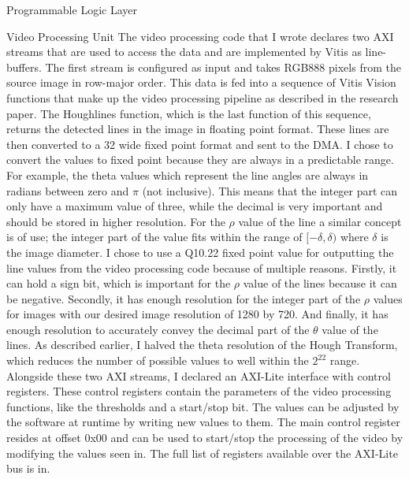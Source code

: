 \documentclass{matthijs}
\begin{document}
\begin{hoofdstuk}{Programmable Logic Layer}
\begin{paragraaf}{Video Processing Unit}
			The video processing code that I wrote declares two AXI streams that are used to access the data and are implemented by Vitis as line-buffers.
			The first stream is configured as input and takes RGB888 pixels from the source image in row-major order.
			This data is fed into a sequence of Vitis Vision functions that make up the video processing pipeline as described in the research paper.
			The Houghlines function, which is the last function of this sequence, returns the detected lines in the image in floating point format.
			These lines are then converted to a \qty{32}{\bit} wide fixed point format and sent to the DMA.
			I chose to convert the values to fixed point because they are always in a predictable range.
			For example, the theta values which represent the line angles are always in radians between zero and $ \pi $ (not inclusive).
			This means that the integer part can only have a maximum value of three, while the decimal is very important and should be stored in higher resolution.
			For the $ \rho $ value of the line a similar concept is of use; the integer part of the value fits within the range of $ [-\delta, \delta) $ where $ \delta $ is the image diameter.
			I chose to use a Q10.22 fixed point value for outputting the line values from the video processing code because of multiple reasons.
			Firstly, it can hold a sign bit, which is important for the $ \rho $ value of the lines because it can be negative.
			Secondly, it has enough resolution for the integer part of the $ \rho $ values for images with our desired image resolution of 1280 by 720.
			And finally, it has enough resolution to accurately convey the decimal part of the $ \theta $ value of the lines.
			As described earlier, I halved the theta resolution of the Hough Transform, which reduces the number of possible values to well within the $ 2^{22} $ range.
			Alongside these two AXI streams, I declared an AXI-Lite interface with control registers.
			These control registers contain the parameters of the video processing functions, like the thresholds and a start/stop bit.
			The values can be adjusted by the software at runtime by writing new values to them.
			The main control register resides at offset 0x00 and can be used to start/stop the processing of the video by modifying the values seen in.
			The full list of registers available over the AXI-Lite bus is in.


\end{paragraaf}
\end{hoofdstuk}
\end{document}

